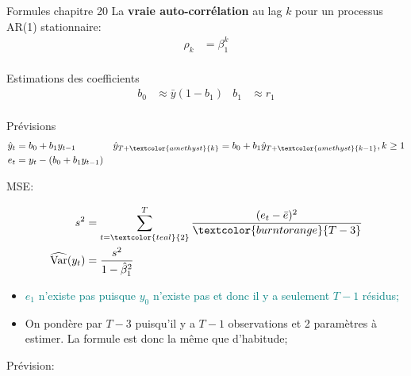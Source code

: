 \documentclass[12pt, titlepage, french]{report}
\begin{document}
\begin{FORMULA_SUMM}{Formules chapitre 20}
La \textbf{vraie auto-corrélation} au lag $k$ pour un processus AR(1) stationnaire:
\begin{align*}
	\rho_{k}	
		&=	\beta_{1}^{k}	\\
\end{align*}

Estimations des coefficients
\begin{align*}
	b_{0}	
		&\approx		\bar{y} (1 - b_{1})	&
	b_{1}	
		&\approx		r_{1}	\\
\end{align*}

Prévisions
\begin{align*}
	\hat{y}_{t}	
		&=	b_{0} + b_{1} y_{t - 1}	&
	\hat{y}_{T + \textcolor{amethyst}{k}}
		&=	b_{0} + b_{1} \hat{y}_{T + \textcolor{amethyst}{k - 1}}, k \ge 1	\\
	e_{t}	
		&=	y_{t} - (b_{0} + b_{1} y_{t - 1})	\\
\end{align*}

MSE:

\begin{minipage}[ht]{0.5\linewidth}
\begin{align*}
	s^{2}
		&=	\sum_{t = \textcolor{teal}{2}}^{T}	\frac{(e_{t} - \bar{e})^{2}}{\textcolor{burntorange}{T - 3}}	\\
	\widehat{\text{Var}}(y_{t})
		&=	\frac{s^{2}}{1 - \hat{\beta}_{1}^{2}}
\end{align*}
\end{minipage}
\begin{minipage}[ht]{0.5\linewidth}
\begin{itemize}
	\item	\textcolor{teal}{$e_{1}$ n'existe pas puisque $y_{0}$ n'existe pas et donc il y a seulement $T - 1$ résidus;}
	\item	\textcolor{burntorange}{On pondère par $T - 3$ puisqu'il y a $T - 1$ observations et 2 paramètres à estimer. La formule est donc la même que d'habitude;}
\end{itemize}
\end{minipage}

Prévision:


\end{FORMULA_SUMM}
\end{document}
